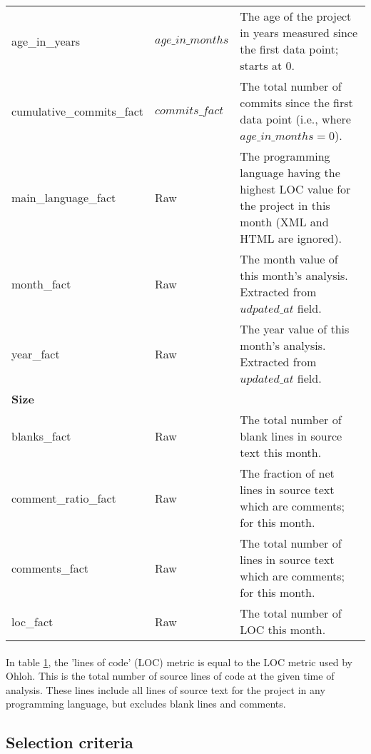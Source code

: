 \begin{table}
\begin{tabular}{p{4cm} p{3cm} p{7.5cm}}
		age\_in\_years & $age\_in\_months$ & The age of the project in years measured
		since the first data point; starts at 0. \\

		cumulative\_commits\_fact & $commits\_fact$ & The total number of commits
		since the first data point (i.e., where $age\_in\_months = 0$). \\

		main\_language\_fact & Raw & The programming language having the highest LOC
		value for the project in this month (XML and HTML are ignored). \\

		month\_fact & Raw & The month value of this month's analysis. Extracted from
		$udpated\_at$ field. \\

		year\_fact & Raw & The year value of this month's analysis. Extracted from
		$updated\_at$ field. \\
		\hline
		
		\bfseries{Size}\rm \\ \hline

		blanks\_fact & Raw & The total number of blank lines in source text this
		month. \\

		comment\_ratio\_fact & Raw & The fraction of net lines in source text which
		are comments; for this month. \\

		comments\_fact & Raw & The total number of lines in source text which are
		comments; for this month. \\

		loc\_fact & Raw & The total number of LOC this month. \\

		\hline
	\end{tabular}
\label{table:fields}
\end{table}

\paragraph{}
In table \ref{table:fields}, the 'lines of code' (LOC) metric is equal to the
LOC metric used by Ohloh. This is the total number of source lines of code at
the given time of analysis. These lines include all lines of source text for
the project in any programming language, but excludes blank lines and comments.

\subsection{Selection criteria}


